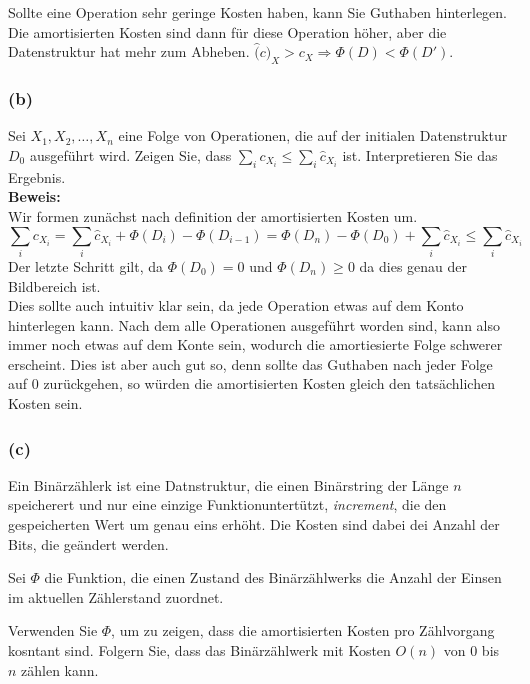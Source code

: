 \documentclass[11pt,a4paper,ngerman]{article}
\begin{document}
Sollte eine Operation sehr geringe Kosten haben, kann Sie Guthaben hinterlegen. Die amortisierten Kosten sind dann für diese Operation höher,
aber die Datenstruktur hat mehr zum Abheben. $\hat(c)_X > c_X \Rightarrow \Phi(D) < \Phi(D')$.

\subsubsection*{(b)}

Sei $X_1, X_2, \dots, X_n$ eine Folge von Operationen, die auf der initialen Datenstruktur $D_0$ ausgeführt wird. Zeigen Sie, dass 
$\sum_i c_{X_i} \leq \sum_i \hat{c}_{X_i}$ ist. Interpretieren Sie das Ergebnis.\\

\noindent\textbf{Beweis:}\\
Wir formen zunächst nach definition der amortisierten Kosten um.
$$
	\sum_i c_{X_i} = \sum_i \hat{c}_{X_i} + \Phi(D_i) - \Phi(D_{i-1}) = \Phi(D_n) - \Phi(D_0) + \sum_i \hat{c}_{X_i} \leq \sum_i \hat{c}_{X_i}
$$
Der letzte Schritt gilt, da $\Phi(D_0) = 0$ und $\Phi(D_n) \geq 0$ da dies genau der Bildbereich ist.\\

Dies sollte auch intuitiv klar sein, da jede Operation etwas auf dem Konto hinterlegen kann. Nach dem alle Operationen ausgeführt worden sind, kann also immer noch etwas auf dem Konte sein, wodurch die amortiesierte Folge schwerer erscheint. Dies ist aber auch gut so, denn sollte das Guthaben nach jeder Folge auf $0$ zurückgehen, so würden die amortisierten Kosten gleich den tatsächlichen Kosten sein.

\subsubsection*{(c)}

Ein Binärzählerk ist eine Datnstruktur, die einen Binärstring der Länge $n$ speicherert und nur eine einzige Funktionuntertützt, \emph{increment}, die den gespeicherten Wert um genau eins erhöht. Die Kosten sind dabei dei Anzahl der Bits, die geändert werden.

Sei $\Phi$ die Funktion, die einen Zustand des Binärzählwerks die Anzahl der Einsen im aktuellen Zählerstand zuordnet.

Verwenden Sie $\Phi$, um zu zeigen, dass die amortisierten Kosten pro Zählvorgang kosntant sind. Folgern Sie, dass das Binärzählwerk mit Kosten $O(n)$ von $0$ bis $n$ zählen kann.\\
\end{document}
